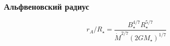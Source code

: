 \documentclass{beamer}
\def\etal{{et~al.}}
\begin{document}


\begin{frame}[noframenumbering]
\frametitle{Альфвеновский радиус}
\begin{equation}
r_A/R_\star =\frac{B_\star^{4/7}R_\star^{5/7}}{\dot{M}^{2/7}(2GM_\star)^{1/7}}
\end{equation}
\end{frame}
\end{document}
